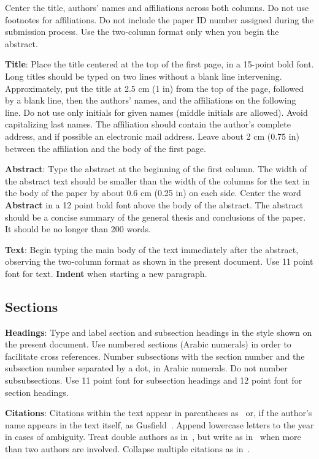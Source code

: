 \documentclass[11pt]{article}
\begin{document}
Center the title, authors' names and affiliations across both
columns. Do not use footnotes for affiliations. Do not include the
paper ID number assigned during the submission process. Use the
two-column format only when you begin the abstract.

{\bf Title}: Place the title centered at the top of the first page, in
a 15-point bold font. Long titles should be typed on two lines without
a blank line intervening. Approximately, put the title at 2.5 cm (1 in) from
the top of the page, followed by a blank line, then the authors'
names, and the affiliations on the following line. Do not use only
initials for given names (middle initials are allowed). Avoid
capitalizing last names. The affiliation should contain the author's
complete address, and if possible an electronic mail address. Leave
about 2 cm (0.75 in) between the affiliation and the body of the first page.

{\bf Abstract}: Type the abstract at the beginning of the first
column. The width of the abstract text should be smaller than the
width of the columns for the text in the body of the paper by about
0.6 cm (0.25 in) on each side. Center the word {\bf Abstract} in a 12 point bold
font above the body of the abstract. The abstract should be a concise
summary of the general thesis and conclusions of the paper. It should
be no longer than 200 words.

{\bf Text}: Begin typing the main body of the text immediately after
the abstract, observing the two-column format as shown in the present
document. Use 11 point font for text. {\bf Indent} when starting a new
paragraph.


\subsection{Sections}

{\bf Headings}: Type and label section and subsection headings in the
style shown on the present document.  Use numbered sections (Arabic
numerals) in order to facilitate cross references. Number subsections
with the section number and the subsection number separated by a dot,
in Arabic numerals. Do not number subsubsections. Use 11 point font for
subsection headings and 12 point font for section headings.

{\bf Citations}: Citations within the text appear
in parentheses as~\cite{Gusfield:97} or, if the author's name appears in
the text itself, as Gusfield~.
Append lowercase letters to the year in cases of ambiguity.
Treat double authors as in~\cite{Aho:72}, but write as
in~\cite{Chandra:81} when more than two authors are involved.
Collapse multiple citations as in~\cite{Gusfield:97,Aho:72}.
\end{document}
